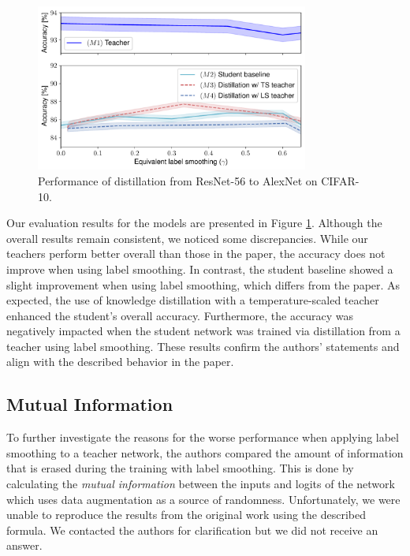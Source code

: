 \begin{figure}[ht]
\centering
\includegraphics[width=0.8\textwidth]{figures/knowledge_distillation.pdf}
\caption{Performance of distillation from ResNet-56 to AlexNet on CIFAR-10.}
\label{fig:conv_dist}

\end{figure}
Our evaluation results for the models are presented in Figure \ref{fig:conv_dist}. Although the overall results remain consistent, we noticed some discrepancies. While our teachers perform better overall than those in the paper, the accuracy does not improve when using label smoothing. In contrast, the student baseline showed a slight improvement when using label smoothing, which differs from the paper. 
As expected, the use of knowledge distillation with a temperature-scaled teacher enhanced the student's overall accuracy. Furthermore, the accuracy was negatively impacted when the student network was trained via distillation from a teacher using label smoothing. These results confirm the authors' statements and align with the described behavior in the paper.

\subsection{Mutual Information}
To further investigate the reasons for the worse performance when applying label smoothing to a teacher network, the authors compared the amount of information that is erased during the training with label smoothing. This is done by calculating the \textit{mutual information} between the inputs and logits of the network which uses data augmentation as a source of randomness.
Unfortunately, we were unable to reproduce the results from the original work using the described formula. We contacted the authors for clarification but we did not receive an answer.

